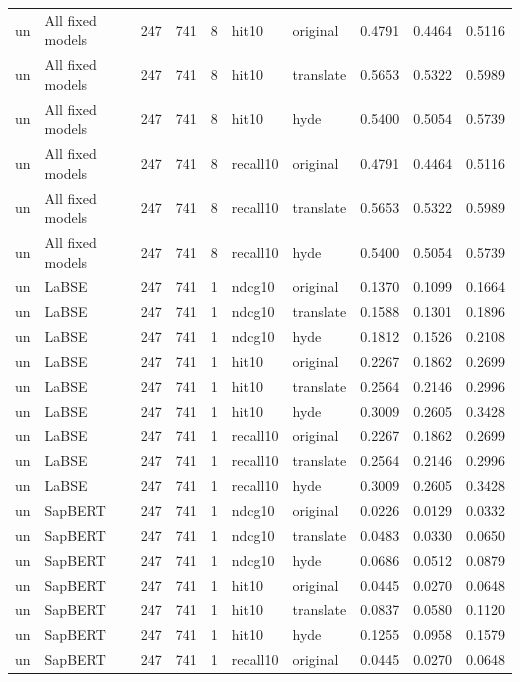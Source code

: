 \begin{tabular}{llrrrllrrr}
un & All fixed models & 247 & 741 & 8 & hit10 & original & 0.4791 & 0.4464 & 0.5116 \\
un & All fixed models & 247 & 741 & 8 & hit10 & translate & 0.5653 & 0.5322 & 0.5989 \\
un & All fixed models & 247 & 741 & 8 & hit10 & hyde & 0.5400 & 0.5054 & 0.5739 \\
un & All fixed models & 247 & 741 & 8 & recall10 & original & 0.4791 & 0.4464 & 0.5116 \\
un & All fixed models & 247 & 741 & 8 & recall10 & translate & 0.5653 & 0.5322 & 0.5989 \\
un & All fixed models & 247 & 741 & 8 & recall10 & hyde & 0.5400 & 0.5054 & 0.5739 \\
un & LaBSE & 247 & 741 & 1 & ndcg10 & original & 0.1370 & 0.1099 & 0.1664 \\
un & LaBSE & 247 & 741 & 1 & ndcg10 & translate & 0.1588 & 0.1301 & 0.1896 \\
un & LaBSE & 247 & 741 & 1 & ndcg10 & hyde & 0.1812 & 0.1526 & 0.2108 \\
un & LaBSE & 247 & 741 & 1 & hit10 & original & 0.2267 & 0.1862 & 0.2699 \\
un & LaBSE & 247 & 741 & 1 & hit10 & translate & 0.2564 & 0.2146 & 0.2996 \\
un & LaBSE & 247 & 741 & 1 & hit10 & hyde & 0.3009 & 0.2605 & 0.3428 \\
un & LaBSE & 247 & 741 & 1 & recall10 & original & 0.2267 & 0.1862 & 0.2699 \\
un & LaBSE & 247 & 741 & 1 & recall10 & translate & 0.2564 & 0.2146 & 0.2996 \\
un & LaBSE & 247 & 741 & 1 & recall10 & hyde & 0.3009 & 0.2605 & 0.3428 \\
un & SapBERT & 247 & 741 & 1 & ndcg10 & original & 0.0226 & 0.0129 & 0.0332 \\
un & SapBERT & 247 & 741 & 1 & ndcg10 & translate & 0.0483 & 0.0330 & 0.0650 \\
un & SapBERT & 247 & 741 & 1 & ndcg10 & hyde & 0.0686 & 0.0512 & 0.0879 \\
un & SapBERT & 247 & 741 & 1 & hit10 & original & 0.0445 & 0.0270 & 0.0648 \\
un & SapBERT & 247 & 741 & 1 & hit10 & translate & 0.0837 & 0.0580 & 0.1120 \\
un & SapBERT & 247 & 741 & 1 & hit10 & hyde & 0.1255 & 0.0958 & 0.1579 \\
un & SapBERT & 247 & 741 & 1 & recall10 & original & 0.0445 & 0.0270 & 0.0648 \\

\end{tabular}

